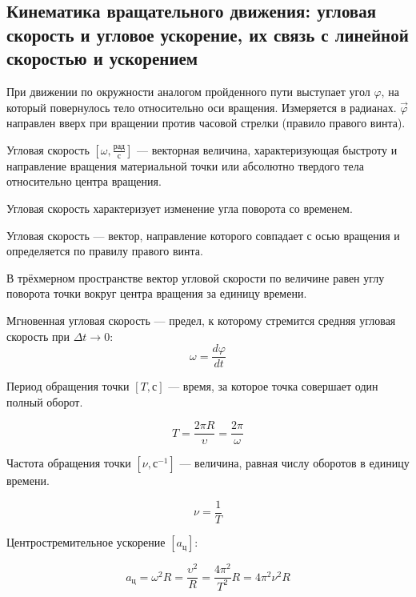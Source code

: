 \subsection{Кинематика вращательного движения: угловая скорость и угловое ускорение, их связь с линейной скоростью и ускорением}

При движении по окружности аналогом пройденного пути выступает угол $\varphi$, на который повернулось тело относительно оси вращения. 
Измеряется в радианах. 
$\vec\varphi$ направлен вверх при вращении против часовой стрелки (правило правого винта).

\begin{definition}
    Угловая скорость $[\omega, \frac{рад}{с}]$ — векторная величина, характеризующая быстроту и направление вращения материальной точки 
или абсолютно твердого тела относительно центра вращения.
\end{definition}

\begin{remark}
    Угловая скорость характеризует изменение угла поворота со временем.

    Угловая скорость — вектор, направление которого совпадает с осью вращения и определяется по правилу правого винта.

    В трёхмерном пространстве вектор угловой скорости по величине равен углу поворота точки вокруг центра вращения за единицу времени.
\end{remark}

\begin{definition}
    Мгновенная угловая скорость — предел, к которому стремится средняя угловая скорость при $\Delta t\to0$:
$$
\omega=\frac{d\varphi}{dt}
$$
\end{definition}

\begin{definition}
    Период обращения точки $[T, с]$ — время, за которое точка совершает один полный оборот.
    
    $$T=\frac{2\pi R}{\upsilon}=\frac{2\pi}{\omega}$$
\end{definition}

\begin{definition}
    Частота обращения точки $[\nu, с^{-1}]$ — величина, равная числу оборотов в единицу времени.

    $$
    \nu=\frac{1}{T}
    $$
\end{definition}

\begin{remark}
    Центростремительное ускорение $[a_ц]$:
    
    $$a_ц=\omega^2R=\frac{\upsilon^2}{R}=\frac{4\pi^2}{T^2}R=4\pi^2\nu^2R$$
\end{remark}

